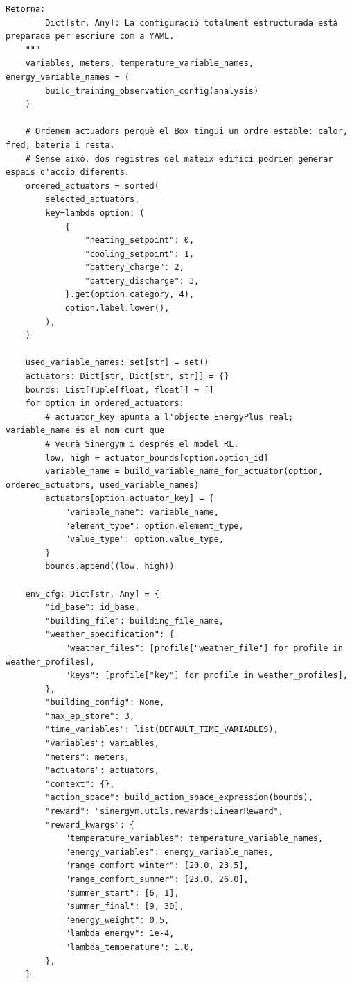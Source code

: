 \documentclass[10pt,a4paper]{article}
\begin{document}
\begin{lstlisting}[style=studioPython,caption={backend/afegir\_entorn\_config.py},label={lst:backend-afegir-entorn-config-py}]
    Retorna:
        Dict[str, Any]: La configuració totalment estructurada està preparada per escriure com a YAML.
    """
    variables, meters, temperature_variable_names, energy_variable_names = (
        build_training_observation_config(analysis)
    )

    # Ordenem actuadors perquè el Box tingui un ordre estable: calor, fred, bateria i resta.
    # Sense això, dos registres del mateix edifici podrien generar espais d'acció diferents.
    ordered_actuators = sorted(
        selected_actuators,
        key=lambda option: (
            {
                "heating_setpoint": 0,
                "cooling_setpoint": 1,
                "battery_charge": 2,
                "battery_discharge": 3,
            }.get(option.category, 4),
            option.label.lower(),
        ),
    )

    used_variable_names: set[str] = set()
    actuators: Dict[str, Dict[str, str]] = {}
    bounds: List[Tuple[float, float]] = []
    for option in ordered_actuators:
        # actuator_key apunta a l'objecte EnergyPlus real; variable_name és el nom curt que
        # veurà Sinergym i després el model RL.
        low, high = actuator_bounds[option.option_id]
        variable_name = build_variable_name_for_actuator(option, ordered_actuators, used_variable_names)
        actuators[option.actuator_key] = {
            "variable_name": variable_name,
            "element_type": option.element_type,
            "value_type": option.value_type,
        }
        bounds.append((low, high))

    env_cfg: Dict[str, Any] = {
        "id_base": id_base,
        "building_file": building_file_name,
        "weather_specification": {
            "weather_files": [profile["weather_file"] for profile in weather_profiles],
            "keys": [profile["key"] for profile in weather_profiles],
        },
        "building_config": None,
        "max_ep_store": 3,
        "time_variables": list(DEFAULT_TIME_VARIABLES),
        "variables": variables,
        "meters": meters,
        "actuators": actuators,
        "context": {},
        "action_space": build_action_space_expression(bounds),
        "reward": "sinergym.utils.rewards:LinearReward",
        "reward_kwargs": {
            "temperature_variables": temperature_variable_names,
            "energy_variables": energy_variable_names,
            "range_comfort_winter": [20.0, 23.5],
            "range_comfort_summer": [23.0, 26.0],
            "summer_start": [6, 1],
            "summer_final": [9, 30],
            "energy_weight": 0.5,
            "lambda_energy": 1e-4,
            "lambda_temperature": 1.0,
        },
    }


\end{lstlisting}
\end{document}
